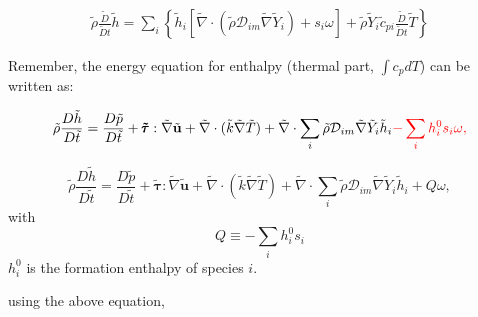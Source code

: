 \documentclass[preprint,12pt,authoryear]{elsarticle}
\begin{document}
\begin{equation}
\begin{split}
        \tilde{\rho}
        \frac{\tilde{D}}{\tilde{D} t}\tilde{h}
        =
        \sum\limits_i
        \left\{
                \tilde{h}_i
                [
                	\tilde{\nabla}\cdot
		     	(
			\tilde{\rho}\mathcal{D}_{im}\tilde{\nabla}\tilde{Y}_i
			)
			+
        		s_i \omega
	        	]
                +
                \tilde{\rho}
                \tilde{Y}_i
                \tilde{c}_{pi}
                \frac{\tilde{D}}{\tilde{D} t}
                \tilde{T}
        \right\}
\end{split}
\end{equation}

Remember, the energy equation for enthalpy {\color{red} (thermal part, $\int c_pdT$) } can be written  as:

\begin{equation}
\begin{split}
        \tilde{\rho}\frac{D  \tilde{h}}{D\tilde{t}}
=
        \frac{D \tilde{p}}{D\tilde{t}}
+       
        \pmb{\tilde{\tau}}:\tilde{\nabla} \tilde{\mathbf{u}} 
+ 
        \tilde{\nabla} \cdot (\tilde{k}\tilde{\nabla} \tilde{T})
+
        \tilde{\nabla} \cdot
        \sum\limits_i 
        \tilde{\rho}\mathcal{D}_{im}\tilde{\nabla}\tilde{Y}_i     
        \tilde{h}_i
        {\color{red}
        -
        \sum_i h_i^0 s_i \omega,
        }
\end{split}
\end{equation}

{\color{red}
\[
       \tilde{\rho}\frac{D  \tilde{h}}{D\tilde{t}}
=
        \frac{D \tilde{p}}{D\tilde{t}}
+       
        \pmb{\tilde{\tau}}:\tilde{\nabla} \tilde{\mathbf{u}} 
+ 
        \tilde{\nabla} \cdot (\tilde{k}\tilde{\nabla} \tilde{T})
+
        \tilde{\nabla} \cdot
        \sum\limits_i 
        \tilde{\rho}\mathcal{D}_{im}\tilde{\nabla}\tilde{Y}_i     
        \tilde{h}_i
        +
        Q\omega,
\]
with
\[
   Q \equiv -\sum_i h_i^0 s_i 
\]
$h_i^0$ is the formation enthalpy of species $i$.
}





using the above equation, 
\end{document}
